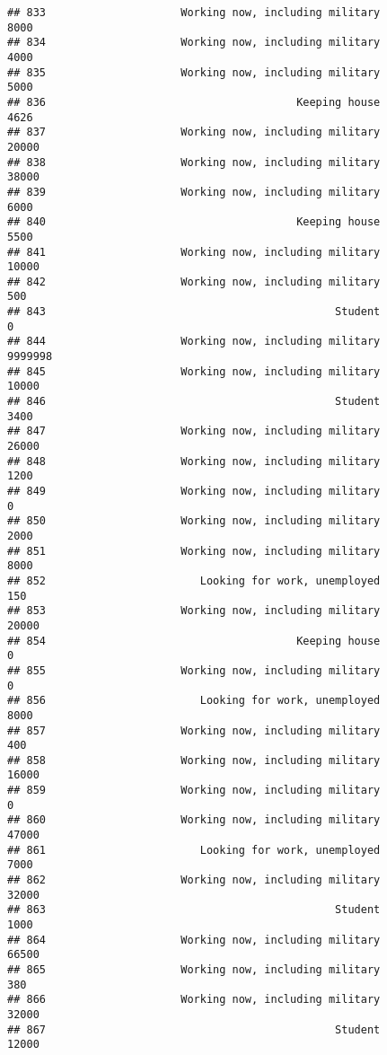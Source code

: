 \documentclass[]{book}
\theoremstyle{definition}
\theoremstyle{definition}
\theoremstyle{remark}
\begin{document}
\begin{verbatim}
## 833                     Working now, including military            8000
## 834                     Working now, including military            4000
## 835                     Working now, including military            5000
## 836                                       Keeping house            4626
## 837                     Working now, including military           20000
## 838                     Working now, including military           38000
## 839                     Working now, including military            6000
## 840                                       Keeping house            5500
## 841                     Working now, including military           10000
## 842                     Working now, including military             500
## 843                                             Student               0
## 844                     Working now, including military         9999998
## 845                     Working now, including military           10000
## 846                                             Student            3400
## 847                     Working now, including military           26000
## 848                     Working now, including military            1200
## 849                     Working now, including military               0
## 850                     Working now, including military            2000
## 851                     Working now, including military            8000
## 852                        Looking for work, unemployed             150
## 853                     Working now, including military           20000
## 854                                       Keeping house               0
## 855                     Working now, including military               0
## 856                        Looking for work, unemployed            8000
## 857                     Working now, including military             400
## 858                     Working now, including military           16000
## 859                     Working now, including military               0
## 860                     Working now, including military           47000
## 861                        Looking for work, unemployed            7000
## 862                     Working now, including military           32000
## 863                                             Student            1000
## 864                     Working now, including military           66500
## 865                     Working now, including military             380
## 866                     Working now, including military           32000
## 867                                             Student           12000

\end{verbatim}
\end{document}
